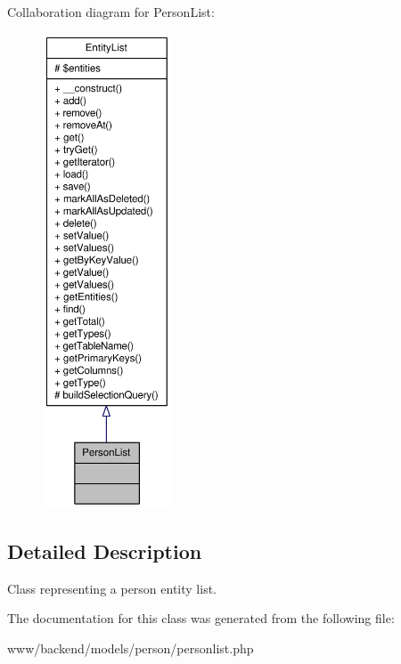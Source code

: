 Collaboration diagram for PersonList:\nopagebreak
\begin{figure}[H]
\begin{center}
\leavevmode
\includegraphics[height=400pt]{classPersonList__coll__graph}
\end{center}
\end{figure}


\subsection{Detailed Description}
Class representing a person entity list. 

The documentation for this class was generated from the following file:\begin{DoxyCompactItemize}
\item 
www/backend/models/person/personlist.php\end{DoxyCompactItemize}
